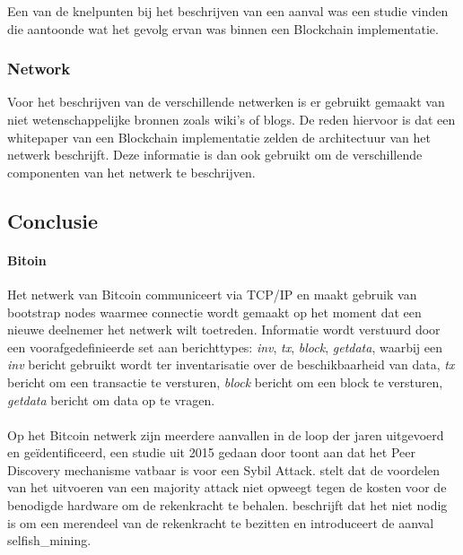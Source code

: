 Een van de knelpunten bij het beschrijven van een aanval was een studie vinden die aantoonde wat het gevolg ervan was binnen een Blockchain implementatie.

\subsubsection{Network}

Voor het beschrijven van de verschillende netwerken is er gebruikt gemaakt van niet wetenschappelijke bronnen zoals wiki's of blogs. De reden hiervoor is dat een whitepaper van een Blockchain implementatie zelden de architectuur van het netwerk beschrijft. Deze informatie is dan ook gebruikt om de verschillende componenten van het netwerk te beschrijven.

\subsection{Conclusie}

\paragraph{Bitoin} Het netwerk van Bitcoin communiceert via TCP/IP en maakt gebruik van bootstrap nodes waarmee connectie wordt gemaakt op het moment dat een nieuwe deelnemer het netwerk wilt toetreden. Informatie wordt verstuurd door een voorafgedefinieerde set aan berichttypes: \textit{inv}, \textit{tx}, \textit{block}, \textit{getdata}, waarbij een \textit{inv} bericht gebruikt wordt ter inventarisatie over de beschikbaarheid van data, \textit{tx} bericht om een transactie te versturen, \textit{block} bericht om een block te versturen, \textit{getdata} bericht om data op te vragen. \\ \\ Op het Bitcoin netwerk zijn meerdere aanvallen in de loop der jaren uitgevoerd en geïdentificeerd, een studie uit 2015 gedaan door \cite{heilman2015eclipse} toont aan dat het Peer Discovery mechanisme vatbaar is voor een Sybil Attack. \cite{nakamoto2008bitcoin} stelt dat de voordelen van het uitvoeren van een majority attack niet opweegt tegen de kosten voor de benodigde hardware om de rekenkracht te behalen. \cite{eyal2014majority} beschrijft dat het niet nodig is om een merendeel van de rekenkracht te bezitten en introduceert de aanval \gls{selfish_mining}.

\newpage
